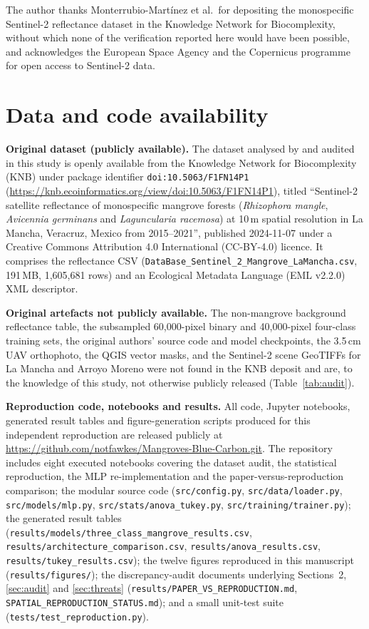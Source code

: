 \documentclass[10pt,twocolumn,a4paper]{article}
\begin{document}
The author thanks Monterrubio-Mart\'inez et al.\ for depositing the monospecific Sentinel-2
reflectance dataset in the Knowledge Network for Biocomplexity, without which none of the
verification reported here would have been possible, and acknowledges the European Space Agency and
the Copernicus programme for open access to Sentinel-2 data.

\section*{Data and code availability}
\label{sec:data}

\textbf{Original dataset (publicly available).} The dataset analysed by \citet{monterrubio2025} and
audited in this study is openly available from the Knowledge Network for Biocomplexity (KNB) under
package identifier \texttt{doi:10.5063/F1FN14P1}
(\url{https://knb.ecoinformatics.org/view/doi:10.5063/F1FN14P1}), titled ``Sentinel-2 satellite
reflectance of monospecific mangrove forests (\emph{Rhizophora mangle}, \emph{Avicennia germinans}
and \emph{Laguncularia racemosa}) at 10\,m spatial resolution in La Mancha, Veracruz, Mexico from
2015--2021'', published 2024-11-07 under a Creative Commons Attribution 4.0 International
(CC-BY-4.0) licence. It comprises the reflectance CSV
(\texttt{DataBase\_Sentinel\_2\_Mangrove\_LaMancha.csv}, 191\,MB, 1{,}605{,}681 rows) and an
Ecological Metadata Language (EML v2.2.0) XML descriptor.

\textbf{Original artefacts not publicly available.} The non-mangrove background reflectance table,
the subsampled 60{,}000-pixel binary and 40{,}000-pixel four-class training sets, the original
authors' source code and model checkpoints, the 3.5\,cm UAV orthophoto, the QGIS vector masks, and
the Sentinel-2 scene GeoTIFFs for La Mancha and Arroyo Moreno were not found in the KNB deposit and
are, to the knowledge of this study, not otherwise publicly released (Table~\ref{tab:audit}).

\textbf{Reproduction code, notebooks and results.} All code, Jupyter notebooks, generated result
tables and figure-generation scripts produced for this independent reproduction are released
publicly at \url{https://github.com/notfawkes/Mangroves-Blue-Carbon.git}. The repository includes
eight executed notebooks covering the dataset audit, the statistical reproduction, the MLP
re-implementation and the paper-versus-reproduction comparison; the modular source code
(\texttt{src/config.py}, \texttt{src/data/loader.py}, \texttt{src/models/mlp.py},
\texttt{src/stats/anova\_tukey.py}, \texttt{src/training/trainer.py}); the generated result tables
(\texttt{results/models/three\_class\_mangrove\_results.csv},
\texttt{results/architecture\_comparison.csv}, \texttt{results/anova\_results.csv},
\texttt{results/tukey\_results.csv}); the twelve figures reproduced in this manuscript
(\texttt{results/figures/}); the discrepancy-audit documents underlying Sections~2,
\ref{sec:audit} and \ref{sec:threats} (\texttt{results/PAPER\_VS\_REPRODUCTION.md},
\texttt{SPATIAL\_REPRODUCTION\_STATUS.md}); and a small unit-test suite
(\texttt{tests/test\_reproduction.py}).
\end{document}
